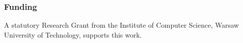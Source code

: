 \documentclass[pdflatex,sn-vancouver-num]{sn-jnl}%
\begin{document}
\subsubsection*{Funding}

A statutory Research Grant from the Institute of Computer Science, Warsaw University of Technology, supports this work.



    \backmatter


    
\end{document}
